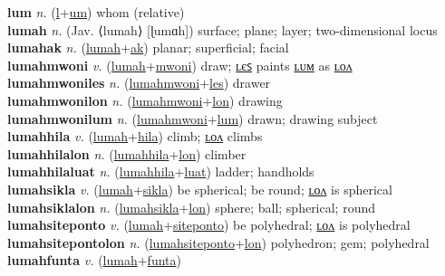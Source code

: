 \textbf{lum} \textit{n.} (\hyperref[l]{l}+\hyperref[m]{um})
whom (relative) \label{lum} \\
\textbf{lumah} \textit{n.} (Jav. ⟨lumah⟩ [ɭumɑh])
surface; plane; layer; two-dimensional locus \label{lumah} \\
\textbf{lumahak} \textit{n.} (\hyperref[lumah]{lumah}+\hyperref[ak]{ak})
planar; superficial; facial \label{lumahak} \\
\textbf{lumahmwoni} \textit{v.} (\hyperref[lumah]{lumah}+\hyperref[mwoni]{mwoni})
draw; \hyperref[lumahmwoniles]{ʟєꜱ} paints \hyperref[lumahmwonilum]{ʟᴜᴍ} as \hyperref[lumahmwonilon]{ʟᴏᴧ} \label{lumahmwoni} \\
\textbf{lumahmwoniles} \textit{n.} (\hyperref[lumahmwoni]{lumahmwoni}+\hyperref[les]{les})
drawer \label{lumahmwoniles} \\
\textbf{lumahmwonilon} \textit{n.} (\hyperref[lumahmwoni]{lumahmwoni}+\hyperref[lon]{lon})
drawing \label{lumahmwonilon} \\
\textbf{lumahmwonilum} \textit{n.} (\hyperref[lumahmwoni]{lumahmwoni}+\hyperref[lum]{lum})
drawn; drawing subject \label{lumahmwonilum} \\
\textbf{lumahhila} \textit{v.} (\hyperref[lumah]{lumah}+\hyperref[hila]{hila})
climb; \hyperref[lumahhilalon]{ʟᴏᴧ} climbs \label{lumahhila} \\
\textbf{lumahhilalon} \textit{n.} (\hyperref[lumahhila]{lumahhila}+\hyperref[lon]{lon})
climber \label{lumahhilalon} \\
\textbf{lumahhilaluat} \textit{n.} (\hyperref[lumahhila]{lumahhila}+\hyperref[luat]{luat})
ladder; handholds \label{lumahhilaluat} \\
\textbf{lumahsikla} \textit{v.} (\hyperref[lumah]{lumah}+\hyperref[sikla]{sikla})
be spherical; be round; \hyperref[lumahsiklalon]{ʟᴏᴧ} is spherical \label{lumahsikla} \\
\textbf{lumahsiklalon} \textit{n.} (\hyperref[lumahsikla]{lumahsikla}+\hyperref[lon]{lon})
sphere; ball; spherical; round \label{lumahsiklalon} \\
\textbf{lumahsiteponto} \textit{v.} (\hyperref[lumah]{lumah}+\hyperref[siteponto]{siteponto})
be polyhedral; \hyperref[lumahsitepontolon]{ʟᴏᴧ} is polyhedral \label{lumahsiteponto} \\
\textbf{lumahsitepontolon} \textit{n.} (\hyperref[lumahsiteponto]{lumahsiteponto}+\hyperref[lon]{lon})
polyhedron; gem; polyhedral \label{lumahsitepontolon} \\
\textbf{lumahfunta} \textit{v.} (\hyperref[lumah]{lumah}+\hyperref[funta]{funta})
